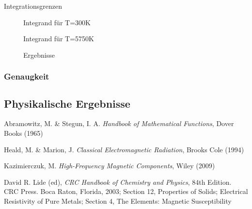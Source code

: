 \documentclass[10pt,a4paper]{article}
\begin{document}
Integrationsgrenzen
\begin{figure}[htbp]
\centering

\caption{Integrand für T=300K}
\end{figure}

\begin{figure}[htbp]
\centering

\caption{Integrand für T=5750K}


\caption{Ergebnisse}
\end{figure}

\subsubsection{Genaugkeit}

\subsection{Physikalische Ergebnisse}
\label{ssec:physikalischeergebnisse}

\begin{thebibliography}{9}

Abramowitz, M. \& Stegun, I. A.
\emph{Handbook of Mathematical Functions},
Dover Books (1965)

Heald, M. \& Marion, J.
\emph{Classical Electromagnetic Radiation},
Brooks Cole (1994)

Kazimierczuk, M.
\emph{High-Frequency Magnetic Components},
Wiley (2009)

David R. Lide (ed),
\emph{CRC Handbook of Chemistry and Physics},
84th Edition. CRC Press. Boca Raton, Florida, 2003;
Section 12, Properties of Solids; Electrical Resistivity of Pure Metals;
Section 4, The Elements: Magnetic Susceptibility

\end{thebibliography}
\end{document}
